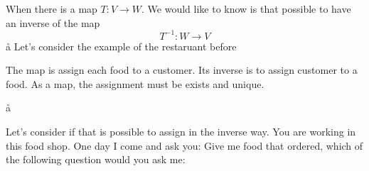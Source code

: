 
\newcommand\map[3]{#1:{#2}\longrightarrow  {#3}}
\newcommand\maps[5]{{#1}:{#2}\longrightarrow {#3},{#4} \mapsto {#5}}

When there is a map $\map TVW$. We would like to know is that possible to have an inverse of the map
$$
\map{T^{-1}}WV
$$
\a\aa
Let's consider the example of the restaruant before



The map is assign each food to a customer. Its inverse is to assign customer to a food. As a map, the assignment must be exists and unique.


\a\aa

Let's consider if that is possible to assign in the inverse way. You are working in this food shop. One day I come and ask you: Give me  food that \sinister ordered, which of the following question would you ask me:

